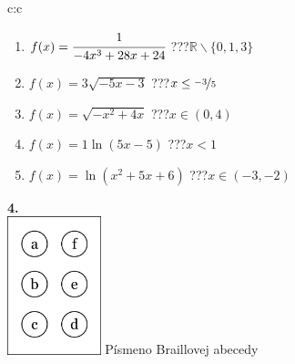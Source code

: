 \documentclass[10pt]{report}
\begin{document}
\begin{tabular}{c:c}
\begin{minipage}[c][99mm][t]{0.49\linewidth}
\begin{center}
\begin{minipage}{0.77\linewidth}
\begin{center}
\begin{varwidth}{\textwidth}
\begin{enumerate}
\item $f(x)=\cfrac{1}{-4x^3+28x+24}$\quad \dotfill\; ???\;\dotfill \quad $\mathbb{R}\smallsetminus\{0,1,3\}$
\item $f(x)=3\sqrt{-5x-3}$\quad \dotfill\; ???\;\dotfill \quad $x\leq\nicefrac{-3}{5}$
\item $f(x)=\sqrt{-x^2+4x}$\quad \dotfill\; ???\;\dotfill \quad $x\in(0 , 4)$
\item $f(x)=1\ln{(5x-5)}$\quad \dotfill\; ???\;\dotfill \quad $x<1$
\item $f(x)=\ln{(x^2+5x+6)}$\quad \dotfill\; ???\;\dotfill \quad $x\in(-3 , -2)$
\end{enumerate}
\end{varwidth}
\end{center}
\end{minipage}
\begin{minipage}{0.20\linewidth}
\begin{center}
{\Huge\bfseries 4.} \\[2mm]
\includegraphics[height=40mm]{../images/braille.png}
{\small Písmeno Braillovej abecedy}
\end{center}
\end{minipage}
\end{center}
\end{minipage}
%
\end{tabular}
\newpage
\thispagestyle{empty}
\end{document}
